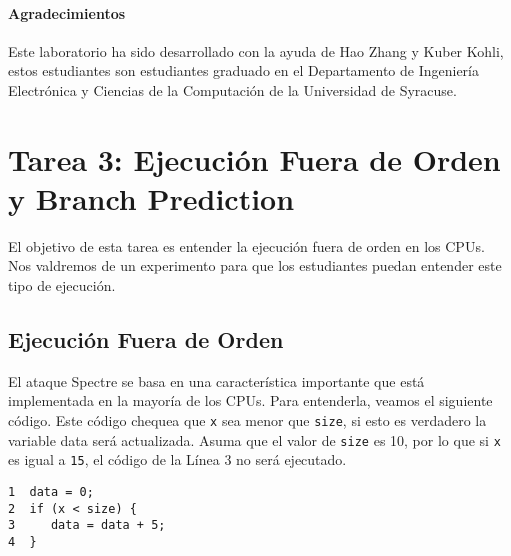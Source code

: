 \paragraph{Agradecimientos} Este laboratorio ha sido desarrollado con la ayuda de 
Hao Zhang y Kuber Kohli, estos estudiantes son estudiantes graduado en el Departamento de Ingeniería Electrónica y Ciencias de la Computación de la Universidad de Syracuse.




\newcommand{\sideChannelFigs}{../Meltdown_Attack/Figs}





\section{Tarea 3: Ejecución Fuera de Orden y Branch Prediction}

El objetivo de esta tarea es entender la ejecución fuera de orden en los CPUs. Nos valdremos de un experimento para que los estudiantes puedan entender este tipo de ejecución.


\subsection{Ejecución Fuera de Orden} 

El ataque Spectre se basa en una característica importante que está implementada en la mayoría de los CPUs. Para entenderla, veamos el siguiente código.
Este código chequea que \texttt{x} sea menor que \texttt{size}, si esto es verdadero la variable data será actualizada. Asuma que el valor de \texttt{size} es 10, por lo que si \texttt{x} es igual a \texttt{15}, el código de la Línea 3 no será ejecutado.


\begin{lstlisting}
1  data = 0;
2  if (x < size) {   
3     data = data + 5; 
4  }
\end{lstlisting}
 
